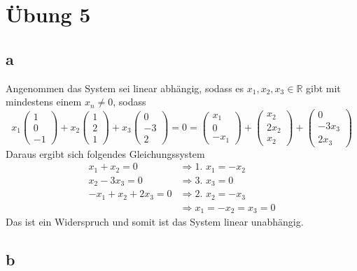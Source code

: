 \documentclass[a4paper,10pt]{article}
\begin{document}
\section*{Übung 5}

\subsection*{a}

Angenommen das System sei linear abhängig, sodass es $x_1, x_2, x_3 \in \mathbb{R}$ gibt mit mindestens einem $x_n \ne 0$, sodass
\begin{equation*}
 x_1\begin{pmatrix}1\\0\\-1\end{pmatrix} + x_2\begin{pmatrix}1\\2\\1\end{pmatrix} + x_3\begin{pmatrix}0\\-3\\2\end{pmatrix} = 0 = \begin{pmatrix}x_1\\0\\-x_1\end{pmatrix} + \begin{pmatrix}x_2\\2x_2\\x_2\end{pmatrix} + \begin{pmatrix}0\\-3x_3\\2x_3\end{pmatrix}
\end{equation*}
Daraus ergibt sich folgendes Gleichungssystem
\begin{align*}
 x_1 + x_2 = 0 & \Rightarrow \text{1. } x_1 = -x_2\\
 x_2 - 3x_3 = 0 & \Rightarrow \text{3. } x_3 = 0\\
 -x_1 + x_2 + 2x_3 = 0 & \Rightarrow \text{2. } x_2 = -x_3\\
 & \Rightarrow x_1 = -x_2 = x_3 = 0
\end{align*}
Das ist ein Widerspruch und somit ist das System linear unabhängig.

\subsection*{b}
\end{document}
